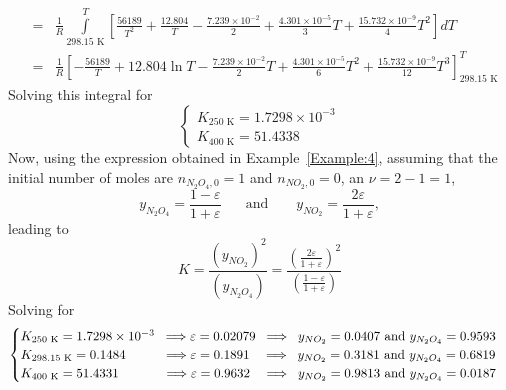 \documentclass[12pts,a4paper,amsmath,amssymb,floatfix]{article}%
\newcommand{\frc}{\displaystyle\frac}
\begin{document}
\begin{enumerate}[1)]
\begin{eqnarray}
                                                &=& \frc{1}{R}\int\limits_{298.15\text{ K}}^{T} \left[\frc{56189}{T^{2}} + \frc{12.804}{T} - \frc{7.239\times 10^{-2}}{2} + \frc{4.301\times 10^{-5}}{3}T + \frc{15.732\times 10^{-9}}{4}T^{2}\right]dT \nonumber \\
                                                &=& \frc{1}{R}\left[-\frc{56189}{T} + 12.804\ln{T} - \frc{7.239\times 10^{-2}}{2}T + \frc{4.301\times 10^{-5}}{6}T^{2} + \frc{15.732\times 10^{-9}}{12}T^{3}\right]_{298.15\text{ K}}^{T} \nonumber
\end{eqnarray}
Solving this integral for
\begin{displaymath}
  \begin{cases}
      K_{250\text{ K}} = 1.7298\times 10^{-3} \\
      K_{400\text{ K}} = 51.4338
  \end{cases}  
\end{displaymath}
Now, using the expression obtained in Example~\ref{Example:4}, assuming that the initial number of moles are $n_{N_{2}O_{4},0}=1$ and $n_{NO_{2},0}=0$, an $\nu= 2-1 = 1$,
         \begin{displaymath}
            y_{N_{2}O_{4}} = \frc{1-\varepsilon}{1+\varepsilon}\;\;\;\;\;\text{ and }\;\;\;\;\;\; y_{NO_{2}} = \frc{2\varepsilon}{1+\varepsilon},
         \end{displaymath}
         leading to
         \begin{displaymath}
             K = \frac{\left(y_{NO_{2}}\right)^{2}}{\left(y_{N_{2}O_{4}}\right)} = \frc{\left(\frc{2\varepsilon}{1+\varepsilon}\right)^{2}}{\left(\frc{1-\varepsilon}{1+\varepsilon}\right)}
         \end{displaymath}
         Solving for
         \begin{displaymath}
           \begin{cases}
             K_{250\text{ K}}   = 1.7298\times10^{-3} \;\;\Longrightarrow \varepsilon = 0.02079 \;\;\Longrightarrow \;\; y_{NO_{2}} = 0.0407 \text{ and } y_{N_{2}O_{4}} = 0.9593 \\
             K_{298.15\text{ K}} = 0.1484 \hspace{1.cm} \Longrightarrow  \varepsilon = 0.1891  \hspace{.35cm} \Longrightarrow \;\; y_{NO_{2}} = 0.3181 \text{ and } y_{N_{2}O_{4}} = 0.6819 \\
             K_{400\text{ K}}   = 51.4331 \hspace{1.2cm} \Longrightarrow \varepsilon = 0.9632  \hspace{.35cm} \Longrightarrow \;\;  y_{NO_{2}} = 0.9813 \text{ and } y_{N_{2}O_{4}} = 0.0187 \\
           \end{cases}
         \end{displaymath}
         






\end{enumerate}
\end{document}

